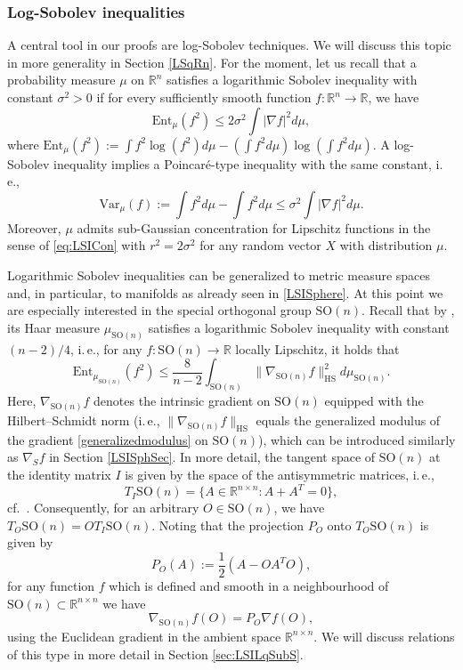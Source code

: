 \documentclass[a4paper,12pt]{amsart}
\numberwithin{equation}{section}
\theoremstyle{remark}
\def\R{{\mathbb R}}
\begin{document}
\subsubsection{Log-Sobolev inequalities}

A central tool in our proofs are log-Sobolev techniques. We will discuss this topic in more generality in Section \ref{LSqRn}. For the moment, let us recall that a probability measure $\mu$ on $\R^n$ satisfies a logarithmic Sobolev inequality with constant $\sigma^2 > 0$ if for every sufficiently smooth function $f \colon \R^n \to \R$, we have
\[
\mathrm{Ent}_\mu(f^2) \le 2\sigma^2 \int |\nabla f|^2 d\mu,
\]
where $\mathrm{Ent}_\mu(f^2) := \int f^2\log(f^2) d\mu - (\int f^2 d\mu) \log(\int f^2 d\mu)$. A log-Sobolev inequality implies a Poincar\'{e}-type inequality with the same constant, i.\,e.,
\[
\mathrm{Var}_\mu(f) := \int f^2 d\mu - \int f^2 d\mu \le \sigma^2 \int |\nabla f|^2 d\mu.
\]
Moreover, $\mu$ admits sub-Gaussian concentration for Lipschitz functions in the sense of \eqref{eq:LSICon} with $r^2=2\sigma^2$ for any random vector $X$ with distribution $\mu$.

Logarithmic Sobolev inequalities can be generalized to metric measure spaces and, in particular, to manifolds as already seen in \eqref{LSISphere}. At this point we are especially interested in the special orthogonal group $\mathrm{SO}(n)$. Recall that by \cite[Th.\ 5.16]{Mec19}, its Haar measure $\mu_{\mathrm{SO}(n)}$ satisfies a logarithmic Sobolev inequality with constant $(n-2)/4$, i.\,e., for any $f \colon \mathrm{SO}(n) \to \R$ locally Lipschitz, it holds that
\begin{equation}\label{LSISO}
\mathrm{Ent}_{\mu_{\mathrm{SO}(n)}} (f^2) \le \frac{8}{n-2} \int_{\mathrm{SO}(n)} \lVert \nabla_{\mathrm{SO}(n)} f \rVert_\mathrm{HS}^2 d\mu_{\mathrm{SO}(n)}.
\end{equation}
Here, $\nabla_{\mathrm{SO}(n)} f$ denotes the intrinsic gradient on $\mathrm{SO}(n)$ equipped with the Hilbert--Schmidt norm (i.\,e., $\lVert \nabla_{\mathrm{SO}(n)} f \rVert_\mathrm{HS}$ equals the generalized modulus of the gradient \eqref{generalizedmodulus} on $\mathrm{SO}(n)$), which can be introduced similarly as $\nabla_S f$ in Section \ref{LSISphSec}. In more detail, the tangent space of $\mathrm{SO}(n)$ at the identity matrix $I$ is given by the space of the antisymmetric matrices, i.\,e.,
\begin{equation}\label{eq:projO}
T_I\mathrm{SO}(n) = \{A \in \R^{n \times n} \colon A + A^T = 0\},
\end{equation}
cf.\ \cite[Lem.\ 1.9]{Mec19}. Consequently, for an arbitrary $O \in \mathrm{SO}(n)$, we have $T_O\mathrm{SO}(n) = OT_I\mathrm{SO}(n)$. Noting that the projection $P_O$ onto $T_O\mathrm{SO}(n)$ is given by
\[
P_O(A) := \frac{1}{2} (A - O A^T O),
\]
for any function $f$ which is defined and smooth in a neighbourhood of $\mathrm{SO}(n) \subset \R^{n \times n}$ we have
\begin{equation}\label{orthprojSOn}
    \nabla_{\mathrm{SO}(n)} f(O) = P_O \nabla f(O),
\end{equation}
using the Euclidean gradient in the ambient space $\R^{n \times n}$. We will discuss relations of this type in more detail in Section \ref{sec:LSILqSubS}.
\end{document}
